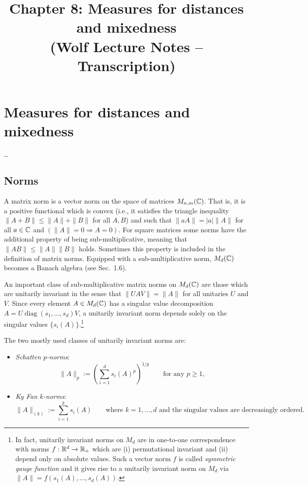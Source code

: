 \documentclass[11pt,a4paper]{article}
\title{Chapter 8: Measures for distances and mixedness\\{\small (Wolf Lecture Notes -- Transcription)}}
\date{}
\theoremstyle{plain}
\theoremstyle{definition}
\theoremstyle{remark}
\begin{document}
\maketitle
\tableofcontents

\setcounter{section}{7}
\section{Measures for distances and mixedness}

\begin{theorem}
    \ldots
\end{theorem}

\subsection{Norms}

A matrix norm is a vector norm on the space of matrices $M_{n,m}(\mathbb{C})$. That is, it
is a positive functional which is convex (i.e., it satisfies the triangle inequality
$\|A+B\|\le \|A\|+\|B\|$ for all $A,B$) and such that $\|aA\|=|a| \|A\|$ for all $a\in\mathbb{C}$
and $(\|A\|=0 \Rightarrow A=0)$. For square matrices some norms have the additional
property of being sub-multiplicative, meaning that $\|AB\|\le \|A\| \|B\|$ holds.
Sometimes this property is included in the definition of matrix norms. Equipped
with a sub-multiplicative norm, $M_d(\mathbb{C})$ becomes a Banach algebra (see Sec.~1.6).

An important class of sub-multiplicative matrix norms on $M_d(\mathbb{C})$ are those
which are unitarily invariant in the sense that $\|UAV\|=\|A\|$ for all unitaries $U$
and $V$. Since every element $A\in M_d(\mathbb{C})$ has a singular value decomposition
$A = U\operatorname{diag}(s_1,\dots,s_d)V$, a unitarily invariant norm depends solely on the singular
values $\{s_i(A)\}$.\footnote{In fact, unitarily invariant norms on $M_d$ are in one-to-one correspondence with norms
    $f:\mathbb{R}^d\to\mathbb{R}_+$ which are (i) permutational invariant and (ii) depend only on absolute values.
    Such a vector norm $f$ is called \emph{symmetric gauge function} and it gives rise to a unitarily invariant
    norm on $M_d$ via $\|A\| = f(s_1(A),\dots,s_d(A))$.}

The two mostly used classes of unitarily invariant norms are:
\begin{itemize}
    \item \emph{Schatten $p$-norms}:
          \[
              \|A\|_p := \left(\sum_{i=1}^d s_i(A)^p\right)^{1/p}
              \qquad\text{for any } p\ge 1,
          \]
    \item \emph{Ky Fan $k$-norms}:
          \[
              \|A\|_{(k)} := \sum_{i=1}^k s_i(A)
              \qquad\text{where } k=1,\dots,d \text{ and the singular values are decreasingly ordered.}
          \]
\end{itemize}
\end{document}

